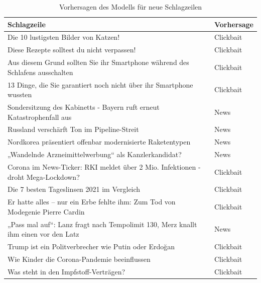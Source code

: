 \begin{table}[h]
    \caption{Vorhersagen des Modells für neue Schlagzeilen}
    \label{PredictNewTab}
    \renewcommand{\arraystretch}{1.2}
    \centering
    \sffamily
    \begin{footnotesize}
        \begin{tabular}{l l}
            \toprule
            \textbf{Schlagzeile}                  & \textbf{Vorhersage} \\
            \midrule
            Die 10 lustigsten Bilder von Katzen! & Clickbait \\
            Diese Rezepte solltest du nicht verpassen!  & Clickbait    \\
            Aus diesem Grund sollten Sie ihr Smartphone während des Schlafens ausschalten                  & Clickbait       \\
            13 Dinge, die Sie garantiert noch nicht über ihr Smartphone wussten   & Clickbait                   \\
            Sondersitzung des Kabinetts - Bayern ruft erneut Katastrophenfall aus   & News        \\
            Russland verschärft Ton im Pipeline-Streit  & News                     \\
            Nordkorea präsentiert offenbar modernisierte Raketentypen & News \\
            „Wandelnde Arzneimittelwerbung“ als Kanzlerkandidat? & News \\
            Corona im News-Ticker: RKI meldet über 2 Mio. Infektionen - droht Mega-Lockdown? & Clickbait \\
            Die 7 besten Tageslinsen 2021 im Vergleich & Clickbait \\
            Er hatte alles – nur ein Erbe fehlte ihm: Zum Tod von Modegenie Pierre Cardin & Clickbait \\
            „Pass mal auf“: Lanz fragt nach Tempolimit 130, Merz knallt ihm einen vor den Latz & News \\
            Trump ist ein Politverbrecher wie Putin oder Erdoğan & Clickbait \\
            Wie Kinder die Corona-Pandemie beeinflussen & Clickbait \\
            Was steht in den Impfstoff-Verträgen? & Clickbait \\
            \bottomrule
        \end{tabular}
    \end{footnotesize}
    \rmfamily
\end{table}

